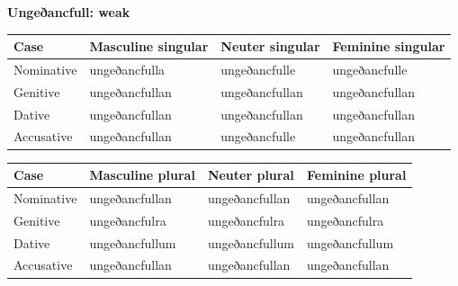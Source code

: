 \textbf{Ungeðancfull: weak}

\par\begingroup
\fontsize{10.5}{13.2}\selectfont
\setlength{\LTleft}{0pt}\setlength{\LTright}{\fill}
\noindent
\begin{tabular}{@{}>{\raggedright\arraybackslash}p{22.0mm}>{\raggedright\arraybackslash}p{31.188mm}>{\raggedright\arraybackslash}p{31.188mm}>{\raggedright\arraybackslash}p{31.188mm}@{}}
\toprule
\textbf{Case} & \textbf{Masculine singular} & \textbf{Neuter singular} & \textbf{Feminine singular} \\
\midrule
Nominative & ungeðancfulla & ungeðancfulle & ungeðancfulle \\
Genitive & ungeðancfullan & ungeðancfullan & ungeðancfullan \\
Dative & ungeðancfullan & ungeðancfullan & ungeðancfullan \\
Accusative & ungeðancfullan & ungeðancfulle & ungeðancfullan \\
\bottomrule
\end{tabular}
\par\endgroup
\par\addvspace{5pt}
\par\begingroup
\fontsize{10.5}{13.2}\selectfont
\setlength{\LTleft}{0pt}\setlength{\LTright}{\fill}
\noindent
\begin{tabular}{@{}>{\raggedright\arraybackslash}p{22.0mm}>{\raggedright\arraybackslash}p{31.188mm}>{\raggedright\arraybackslash}p{31.188mm}>{\raggedright\arraybackslash}p{31.188mm}@{}}
\toprule
\textbf{Case} & \textbf{Masculine plural} & \textbf{Neuter plural} & \textbf{Feminine plural} \\
\midrule
Nominative & ungeðancfullan & ungeðancfullan & ungeðancfullan \\
Genitive & ungeðancfulra & ungeðancfulra & ungeðancfulra \\
Dative & ungeðancfullum & ungeðancfullum & ungeðancfullum \\
Accusative & ungeðancfullan & ungeðancfullan & ungeðancfullan \\
\bottomrule
\end{tabular}
\par\endgroup

